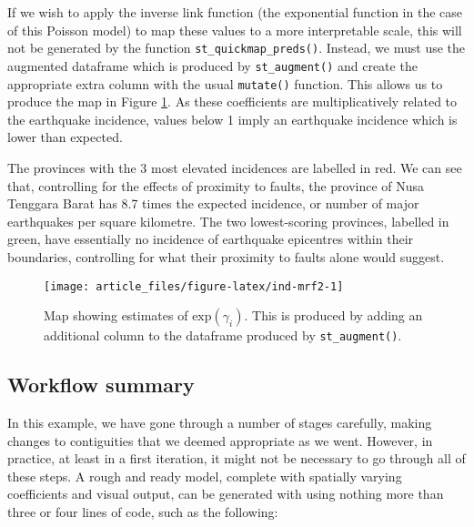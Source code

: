 If we wish to apply the inverse link function (the exponential function in the case of this Poisson model) to map these values to a more interpretable scale, this will not be generated by the function \texttt{st\_quickmap\_preds()}. Instead, we must use the augmented dataframe which is produced by \texttt{st\_augment()} and create the appropriate extra column with the usual  \texttt{mutate()} function. This allows us to produce the map in Figure
\ref{fig:ind-mrf2}. As these coefficients are multiplicatively related to the earthquake incidence, values below 1 imply an earthquake incidence which is lower than expected.

The provinces with the 3 most elevated incidences are labelled in red. We can see that, controlling for the effects of proximity to faults, the province of Nusa Tenggara Barat has 8.7 times the expected incidence, or number of major earthquakes per square kilometre. The two lowest-scoring provinces, labelled in green, have essentially no incidence of earthquake epicentres within their boundaries, controlling for what their proximity to faults alone would suggest.



\begin{figure}

{\centering \texttt{[image: article\_files/figure-latex/ind-mrf2-1]} 

}

\caption{Map showing estimates of \(\text{exp}(\gamma_i).\) This is produced by adding an additional column to the dataframe produced by \texttt{st\_augment()}.}\label{fig:ind-mrf2}
\end{figure}

\subsection{Workflow summary}\label{workflow-summary}

In this example, we have gone through a number of stages carefully, making changes to contiguities that we deemed appropriate as we went. However, in practice, at least in a first iteration, it might not be necessary to go through all of these steps. A rough and ready model, complete with spatially varying coefficients and visual output, can be generated with  using nothing more than three or four lines of code, such as the following:

